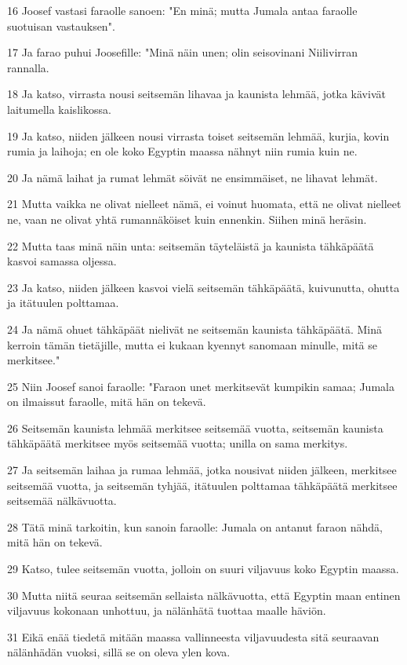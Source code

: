 \par 16 Joosef vastasi faraolle sanoen: "En minä; mutta Jumala antaa faraolle suotuisan vastauksen".
\par 17 Ja farao puhui Joosefille: "Minä näin unen; olin seisovinani Niilivirran rannalla.
\par 18 Ja katso, virrasta nousi seitsemän lihavaa ja kaunista lehmää, jotka kävivät laitumella kaislikossa.
\par 19 Ja katso, niiden jälkeen nousi virrasta toiset seitsemän lehmää, kurjia, kovin rumia ja laihoja; en ole koko Egyptin maassa nähnyt niin rumia kuin ne.
\par 20 Ja nämä laihat ja rumat lehmät söivät ne ensimmäiset, ne lihavat lehmät.
\par 21 Mutta vaikka ne olivat nielleet nämä, ei voinut huomata, että ne olivat nielleet ne, vaan ne olivat yhtä rumannäköiset kuin ennenkin. Siihen minä heräsin.
\par 22 Mutta taas minä näin unta: seitsemän täyteläistä ja kaunista tähkäpäätä kasvoi samassa oljessa.
\par 23 Ja katso, niiden jälkeen kasvoi vielä seitsemän tähkäpäätä, kuivunutta, ohutta ja itätuulen polttamaa.
\par 24 Ja nämä ohuet tähkäpäät nielivät ne seitsemän kaunista tähkäpäätä. Minä kerroin tämän tietäjille, mutta ei kukaan kyennyt sanomaan minulle, mitä se merkitsee."
\par 25 Niin Joosef sanoi faraolle: "Faraon unet merkitsevät kumpikin samaa; Jumala on ilmaissut faraolle, mitä hän on tekevä.
\par 26 Seitsemän kaunista lehmää merkitsee seitsemää vuotta, seitsemän kaunista tähkäpäätä merkitsee myös seitsemää vuotta; unilla on sama merkitys.
\par 27 Ja seitsemän laihaa ja rumaa lehmää, jotka nousivat niiden jälkeen, merkitsee seitsemää vuotta, ja seitsemän tyhjää, itätuulen polttamaa tähkäpäätä merkitsee seitsemää nälkävuotta.
\par 28 Tätä minä tarkoitin, kun sanoin faraolle: Jumala on antanut faraon nähdä, mitä hän on tekevä.
\par 29 Katso, tulee seitsemän vuotta, jolloin on suuri viljavuus koko Egyptin maassa.
\par 30 Mutta niitä seuraa seitsemän sellaista nälkävuotta, että Egyptin maan entinen viljavuus kokonaan unhottuu, ja nälänhätä tuottaa maalle häviön.
\par 31 Eikä enää tiedetä mitään maassa vallinneesta viljavuudesta sitä seuraavan nälänhädän vuoksi, sillä se on oleva ylen kova.
